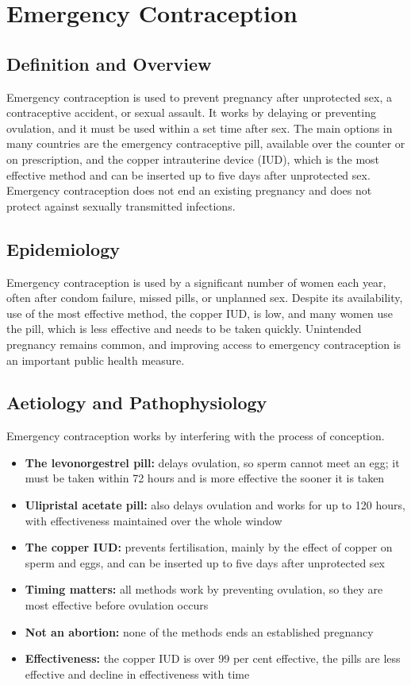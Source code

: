 \chapter{Emergency Contraception}

\section*{Definition and Overview}
Emergency contraception is used to prevent pregnancy after unprotected sex, a contraceptive accident, or sexual assault. It works by delaying or preventing ovulation, and it must be used within a set time after sex. The main options in many countries are the emergency contraceptive pill, available over the counter or on prescription, and the copper intrauterine device (IUD), which is the most effective method and can be inserted up to five days after unprotected sex. Emergency contraception does not end an existing pregnancy and does not protect against sexually transmitted infections.

\section*{Epidemiology}
Emergency contraception is used by a significant number of women each year, often after condom failure, missed pills, or unplanned sex. Despite its availability, use of the most effective method, the copper IUD, is low, and many women use the pill, which is less effective and needs to be taken quickly. Unintended pregnancy remains common, and improving access to emergency contraception is an important public health measure.

\section*{Aetiology and Pathophysiology}
Emergency contraception works by interfering with the process of conception.
\begin{itemize}
    \item \textbf{The levonorgestrel pill:} delays ovulation, so sperm cannot meet an egg; it must be taken within 72 hours and is more effective the sooner it is taken
    \item \textbf{Ulipristal acetate pill:} also delays ovulation and works for up to 120 hours, with effectiveness maintained over the whole window
    \item \textbf{The copper IUD:} prevents fertilisation, mainly by the effect of copper on sperm and eggs, and can be inserted up to five days after unprotected sex
    \item \textbf{Timing matters:} all methods work by preventing ovulation, so they are most effective before ovulation occurs
    \item \textbf{Not an abortion:} none of the methods ends an established pregnancy
    \item \textbf{Effectiveness:} the copper IUD is over 99 per cent effective, the pills are less effective and decline in effectiveness with time
\end{itemize}

